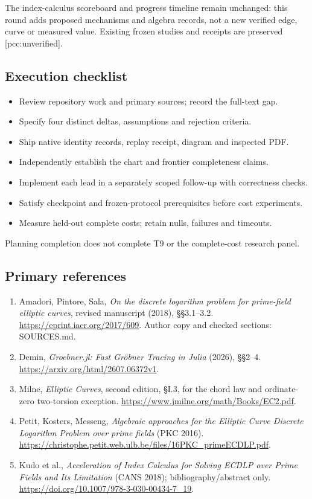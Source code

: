 \documentclass[
  10pt,
]{article}
\providecommand{\tightlist}{%
  \setlength{\itemsep}{0pt}\setlength{\parskip}{0pt}}
\begin{document}
The index-calculus scoreboard and progress timeline remain unchanged:
this round adds proposed mechanisms and algebra records, not a new
verified edge, curve or measured value. Existing frozen studies and
receipts are preserved {[}pcc:unverified{]}.

\subsection{Execution checklist}\label{execution-checklist}

\begin{itemize}
\tightlist
\item[$\boxtimes$]
  Review repository work and primary sources; record the full-text gap.
\item[$\boxtimes$]
  Specify four distinct deltas, assumptions and rejection criteria.
\item[$\boxtimes$]
  Ship native identity records, replay receipt, diagram and inspected
  PDF.
\item[$\square$]
  Independently establish the chart and frontier completeness claims.
\item[$\square$]
  Implement each lead in a separately scoped follow-up with correctness
  checks.
\item[$\square$]
  Satisfy checkpoint and frozen-protocol prerequisites before cost
  experiments.
\item[$\square$]
  Measure held-out complete costs; retain nulls, failures and timeouts.
\end{itemize}

Planning completion does not complete T9 or the complete-cost research
panel.

\subsection{Primary references}\label{primary-references}

\begin{enumerate}
\def\labelenumi{\arabic{enumi}.}
\tightlist
\item
  Amadori, Pintore, Sala, \emph{On the discrete logarithm problem for
  prime-field elliptic curves}, revised manuscript (2018), §§3.1--3.2.
  \url{https://eprint.iacr.org/2017/609}. Author copy and checked
  sections: SOURCES.md.
\item
  Demin, \emph{Groebner.jl: Fast Gröbner Tracing in Julia} (2026),
  §§2--4. \url{https://arxiv.org/html/2607.06372v1}.
\item
  Milne, \emph{Elliptic Curves}, second edition, §I.3, for the chord law
  and ordinate-zero two-torsion exception.
  \url{https://www.jmilne.org/math/Books/EC2.pdf}.
\item
  Petit, Kosters, Messeng, \emph{Algebraic approaches for the Elliptic
  Curve Discrete Logarithm Problem over prime fields} (PKC 2016).
  \url{https://christophe.petit.web.ulb.be/files/16PKC_primeECDLP.pdf}.
\item
  Kudo et al., \emph{Acceleration of Index Calculus for Solving ECDLP
  over Prime Fields and Its Limitation} (CANS 2018);
  bibliography/abstract only.
  \url{https://doi.org/10.1007/978-3-030-00434-7_19}.
\end{enumerate}
\end{document}
